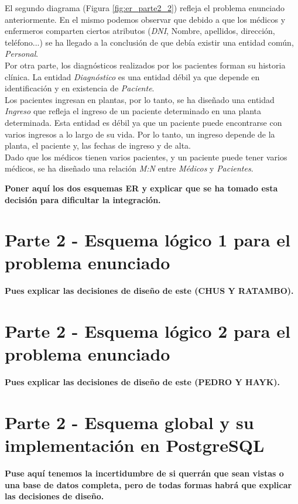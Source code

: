 \documentclass{article}
\begin{document}
El segundo diagrama (Figura \ref{fig:er_parte2_2}) refleja el problema enunciado anteriormente. En el mismo podemos observar que debido a que los médicos y enfermeros comparten ciertos atributos (\emph{DNI}, Nombre, apellidos, dirección, teléfono...) se ha llegado a la conclusión de que debía existir una entidad común, \emph{Personal}.\\
Por otra parte, los diagnósticos realizados por los pacientes forman su historia clínica. La entidad \emph{Diagnóstico} es una entidad débil ya que depende en identificación y en existencia de \emph{Paciente}.\\
Los pacientes ingresan en plantas, por lo tanto, se ha diseñado una entidad \emph{Ingreso} que refleja el ingreso de un paciente determinado en una planta determinada. Esta entidad es débil ya que un paciente puede encontrarse con varios ingresos a lo largo de su vida. Por lo tanto, un ingreso depende de la planta, el paciente y, las fechas de ingreso y de alta.\\
Dado que los médicos tienen varios pacientes, y un paciente puede tener varios médicos, se ha diseñado una relación \emph{M:N} entre \emph{Médicos} y \emph{Pacientes}.

\textbf{Poner aquí los dos esquemas ER y explicar que se ha tomado esta decisión para dificultar la integración.}

\section{Parte 2 - Esquema lógico 1 para el problema enunciado}

\textbf{Pues explicar las decisiones de diseño de este (CHUS Y RATAMBO).}

\section{Parte 2 - Esquema lógico 2 para el problema enunciado}

\textbf{Pues explicar las decisiones de diseño de este (PEDRO Y HAYK).}

\section{Parte 2 - Esquema global y su implementación en PostgreSQL}

\textbf{Puse aquí tenemos la incertidumbre de si querrán que sean vistas o una base de datos completa, pero de todas formas habrá que explicar las decisiones de diseño.}
\end{document}
